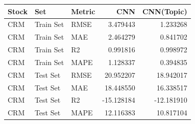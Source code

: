 \begin{tabular}{lllrr}
\toprule
Stock & Set & Metric & CNN & CNN(Topic) \\
\midrule
CRM & Train Set & RMSE & 3.479443 & 1.233268 \\
CRM & Train Set & MAE & 2.464279 & 0.841702 \\
CRM & Train Set & R2 & 0.991816 & 0.998972 \\
CRM & Train Set & MAPE & 1.128337 & 0.394835 \\
CRM & Test Set & RMSE & 20.952207 & 18.942017 \\
CRM & Test Set & MAE & 18.448550 & 16.338517 \\
CRM & Test Set & R2 & -15.128184 & -12.181910 \\
CRM & Test Set & MAPE & 12.116383 & 10.817104 \\
\bottomrule
\end{tabular}
